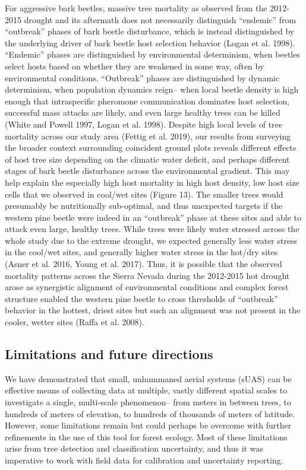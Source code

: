 \documentclass[]{article}
\begin{document}
For aggressive bark beetles, massive tree mortality as observed from the
2012-2015 drought and its aftermath does not necessarily distinguish
``endemic'' from ``outbreak'' phases of bark beetle disturbance, which
is instead distinguished by the underlying driver of bark beetle host
selection behavior (Logan et al. 1998). ``Endemic'' phases are
distinguished by environmental determinism, when beetles select hosts
based on whether they are weakened in some way, often by environmental
conditions. ``Outbreak'' phases are distinguished by dynamic
determinism, when population dynamics reign-- when local beetle density
is high enough that intraspecific pheromone communication dominates host
selection, successful mass attacks are likely, and even large healthy
trees can be killed (White and Powell 1997, Logan et al. 1998). Despite
high local levels of tree mortality across our study area (Fettig et al.
2019), our results from surveying the broader context surrounding
coincident ground plots reveals different effects of host tree size
depending on the climatic water deficit, and perhaps different stages of
bark beetle disturbance across the environmental gradient. This may help
explain the especially high host mortality in high host density, low
host size cells that we observed in cool/wet sites (Figure 13). The
smaller trees would presumably be nutritionally sub-optimal, and thus
unexpected targets if the western pine beetle were indeed in an
``outbreak'' phase at these sites and able to attack even large, healthy
trees. While trees were likely water stressed across the whole study due
to the extreme drought, we expected generally less water stress in the
cool/wet sites, and generally higher water stress in the hot/dry sites
(Asner et al. 2016, Young et al. 2017). Thus, it is possible that the
observed mortality patterns across the Sierra Nevada during the
2012-2015 hot drought arose as synergistic alignment of environmental
conditions and complex forest structure enabled the western pine beetle
to cross thresholds of ``outbreak'' behavior in the hottest, driest
sites but such an alignment was not present in the cooler, wetter sites
(Raffa et al. 2008).

\subsection{Limitations and future
directions}\label{limitations-and-future-directions}

We have demonstrated that small, unhummaned aerial systems (sUAS) can be
effective means of collecting data at multiple, vastly different spatial
scales to investigate a single, multi-scale phenomenon-- from meters in
between trees, to hundreds of meters of elevation, to hundreds of
thousands of meters of latitude. However, some limitations remain but
could perhaps be overcome with further refinements in the use of this
tool for forest ecology. Most of these limitations arise from tree
detection and classification uncertainty, and thus it was imperative to
work with field data for calibration and uncertainty reporting.
\end{document}
